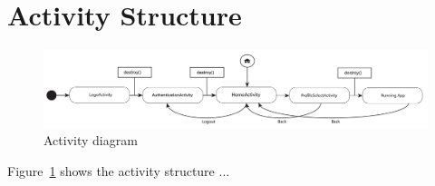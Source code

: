 \section{Activity Structure}

\begin{figure}[h!]
	\centering
	\includegraphics[width=1\textwidth]{gfx/activityDiagram.pdf}
	\caption{Activity diagram}
	\label{fig:activity_diagram}
\end{figure}

Figure~\ref{fig:activity_diagram} shows the activity structure ... 